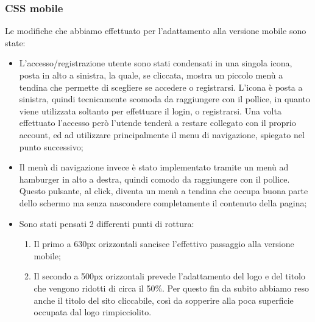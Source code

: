 \subsubsection{CSS mobile}
Le modifiche che abbiamo effettuato per l’adattamento alla versione mobile sono state:
\begin{itemize}
\item L’accesso/registrazione utente sono stati condensati in una singola icona, posta in alto a sinistra, la quale, se cliccata, mostra un piccolo menù a tendina che permette di scegliere se accedere o registrarsi. L'icona è posta a sinistra, quindi tecnicamente scomoda da raggiungere con il pollice, in quanto viene utilizzata soltanto per effettuare il login, o registrarsi. Una volta effettuato l'accesso però l'utende tenderà a restare collegato con il proprio account, ed ad utilizzare principalmente il menu di navigazione, spiegato nel punto successivo;
\item Il menù di navigazione invece è stato implementato tramite un menù ad hamburger in alto a destra, quindi comodo da raggiungere con il pollice. Questo pulsante, al click, diventa un menù a tendina che occupa buona parte dello schermo ma senza nascondere completamente il contenuto della pagina;
\item Sono stati pensati 2 differenti punti di rottura:
\begin{enumerate}
\item Il primo a 630px orizzontali sancisce l’effettivo passaggio alla versione mobile;
\item Il secondo a 500px orizzontali prevede l’adattamento del logo e del titolo che vengono ridotti di circa il 50\%. Per questo fin da subito abbiamo reso anche il titolo del sito cliccabile, così da sopperire alla poca superficie occupata dal logo rimpicciolito.
\end{enumerate}
\end{itemize}

\smallskip

